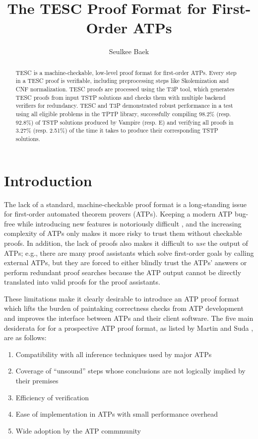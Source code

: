 \documentclass[12pt]{article}
\title{The TESC Proof Format for First-Order ATPs}
\author{Seulkee Baek}
\date{}
\affil{Department of Philosophy, Carnegie Mellon University}
\affil{\textit{seulkeeb@andrew.cmu.edu}}
\begin{document}
\maketitle

\begin{abstract}
TESC is a machine-checkable, low-level proof format for first-order ATPs. 
Every step in a TESC proof is verifiable, including preprocessing steps like 
Skolemization and CNF normalization. TESC proofs are processed using the T3P 
tool, which generates TESC proofs from input TSTP solutions and checks them
with multiple backend verifiers for redundancy. TESC and T3P demonstrated
robust performance in a test using all eligible problems in the TPTP library,
successfully compiling 98.2\% (resp. 92.8\%) of TSTP solutions produced by 
Vampire (resp. E) and verifying all proofs in 3.27\% (resp. 2.51\%) of the 
time it takes to produce their corresponding TSTP solutions.
\end{abstract}

\section{Introduction}

The lack of a standard, machine-checkable proof format is a long-standing 
issue for first-order automated theorem provers (ATPs). 
Keeping a modern ATP bug-free while introducing new features is notoriously  
difficult \cite{}, and the increasing complexity of ATPs only makes it 
more risky to trust them without checkable proofs.
In addition, the lack of proofs also makes it difficult to \textit{use}
the output of ATPs; e.g., there are many proof assistants which 
solve first-order goals by calling external ATPs, but they are forced to 
either blindly trust the ATPs' answers \cite{} or perform redundant proof 
searches \cite{} because the ATP output cannot be directly translated into 
valid proofs for the proof assistants. 

These limitations make it clearly desirable to introduce an ATP proof format  
which lifts the burden of paintaking correctness checks from ATP development 
and improves the interface between ATPs and their client software. The five main
desiderata for for a prospective ATP proof format, as listed by Martin and Suda \cite{}, 
are as follows:
\begin{enumerate}
  \item Compatibility with all inference techniques used by major ATPs
  \item Coverage of ``unsound'' steps whose conclusions are not logically implied by their premises
  \item Efficiency of verification
  \item Ease of implementation in ATPs with small performance overhead
  \item Wide adoption by the ATP commmunity
\end{enumerate}
\end{document}
